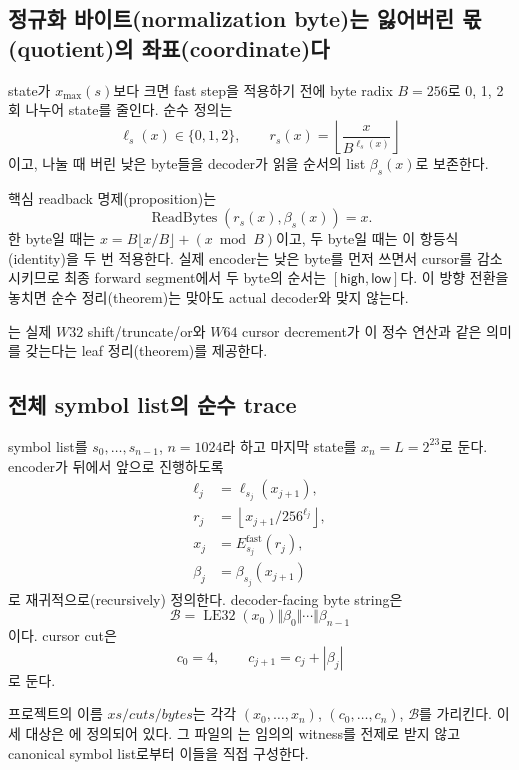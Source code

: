 \subsection{정규화 바이트(normalization byte)는 잃어버린 몫(quotient)의
좌표(coordinate)다}

state가 \(x_{\max}(s)\)보다 크면 fast step을 적용하기 전에 byte radix
\(B=256\)로 0, 1, 2회 나누어 state를 줄인다. 순수 정의는
\[
  \ell_s(x)\in\{0,1,2\},\qquad
  r_s(x)=\left\lfloor\frac{x}{B^{\ell_s(x)}}\right\rfloor
\]
이고, 나눌 때 버린 낮은 byte들을 decoder가 읽을 순서의 list
\(\beta_s(x)\)로 보존한다.

핵심 readback 명제(proposition)는
\[
  \operatorname{ReadBytes}(r_s(x),\beta_s(x))=x.
\]
한 byte일 때는 \(x=B\lfloor x/B\rfloor+(x\bmod B)\)이고, 두 byte일 때는
이 항등식(identity)을 두 번 적용한다. 실제 encoder는 낮은 byte를 먼저 쓰면서 cursor를
감소시키므로 최종 forward segment에서 두 byte의 순서는
\([\mathsf{high},\mathsf{low}]\)다. 이 방향 전환을 놓치면 순수 정리(theorem)는 맞아도
actual decoder와 맞지 않는다.

는 실제 \(W32\) shift/truncate/or와
\(W64\) cursor decrement가 이 정수 연산과 같은 의미를 갖는다는
leaf 정리(theorem)를
제공한다.

\subsection{전체 symbol list의 순수 trace}

symbol list를 \(s_0,\ldots,s_{n-1}\), \(n=1024\)라 하고 마지막 state를
\(x_n=L=2^{23}\)로 둔다. encoder가 뒤에서 앞으로 진행하도록
\[
\begin{aligned}
  \ell_j&=\ell_{s_j}(x_{j+1}),\\
  r_j&=\left\lfloor x_{j+1}/256^{\ell_j}\right\rfloor,\\
  x_j&=E^{\mathrm{fast}}_{s_j}(r_j),\\
  \beta_j&=\beta_{s_j}(x_{j+1})
\end{aligned}
\]
로 재귀적으로(recursively) 정의한다. decoder-facing byte string은
\[
  \mathcal B=\operatorname{LE32}(x_0)
    \Vert\beta_0\Vert\cdots\Vert\beta_{n-1}
\]
이다. cursor cut은
\[
  c_0=4,\qquad c_{j+1}=c_j+|\beta_j|
\]
로 둔다.

프로젝트의 이름 \(xs/cuts/bytes\)는 각각
\((x_0,\ldots,x_n)\), \((c_0,\ldots,c_n)\), \(\mathcal B\)를 가리킨다. 이 세
대상은 에 정의되어 있다. 그 파일의
는 임의의 witness를 전제로 받지 않고 canonical
symbol list로부터 이들을 직접 구성한다.

